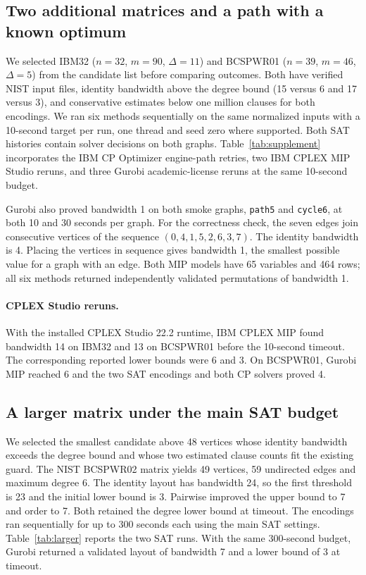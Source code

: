 \documentclass[a4paper,fleqn]{cas-sc}
\begin{document}

\subsection{Two additional matrices and a path with a known optimum}
We selected IBM32 ($n=32$, $m=90$, $\Delta=11$) and BCSPWR01
($n=39$, $m=46$, $\Delta=5$) from the candidate list before comparing
outcomes. Both have verified NIST input files, identity bandwidth above
the degree bound (15 versus 6 and 17 versus 3), and conservative estimates
below one million clauses for both encodings. We ran six methods sequentially
on the same normalized inputs with a 10-second target per run, one thread
and seed zero where supported. Both SAT histories contain solver decisions
on both graphs. Table~\ref{tab:supplement} incorporates the IBM CP Optimizer
engine-path retries, two IBM CPLEX MIP Studio reruns, and three Gurobi academic-license reruns at the same
10-second budget.

\begin{samepage}
Gurobi also proved bandwidth 1 on both smoke graphs, \texttt{path5} and \texttt{cycle6}, at both 10 and 30 seconds per graph.
For the correctness check, the seven edges join consecutive vertices of
the sequence $(0,4,1,5,2,6,3,7)$. The identity bandwidth is 4. Placing
the vertices in sequence gives bandwidth 1, the smallest possible value
for a graph with an edge. Both MIP models have 65 variables and 464 rows;
all six methods returned independently validated permutations of bandwidth 1.
\end{samepage}


\paragraph{CPLEX Studio reruns.}
With the installed CPLEX Studio 22.2 runtime, IBM CPLEX MIP found
bandwidth 14 on IBM32 and 13 on BCSPWR01 before the 10-second timeout.
The corresponding reported lower bounds were 6 and 3. On BCSPWR01,
Gurobi MIP reached 6 and the two SAT encodings and both CP solvers
proved 4.
\subsection{A larger matrix under the main SAT budget}
We selected the smallest candidate above 48 vertices whose identity
bandwidth exceeds the degree bound and whose two estimated clause counts
fit the existing guard. The NIST BCSPWR02 matrix yields 49 vertices,
59 undirected edges and maximum degree 6. The identity layout has
bandwidth 24, so the first threshold is 23 and the initial lower bound
is 3. Pairwise improved the upper bound to 7 and order to 7. Both retained the degree lower bound at timeout. The encodings ran sequentially for up to 300 seconds each using
the main SAT settings. Table~\ref{tab:larger} reports the two SAT runs. With the same 300-second budget, Gurobi returned a validated layout of bandwidth 7 and a lower bound of 3 at timeout.



\end{document}

